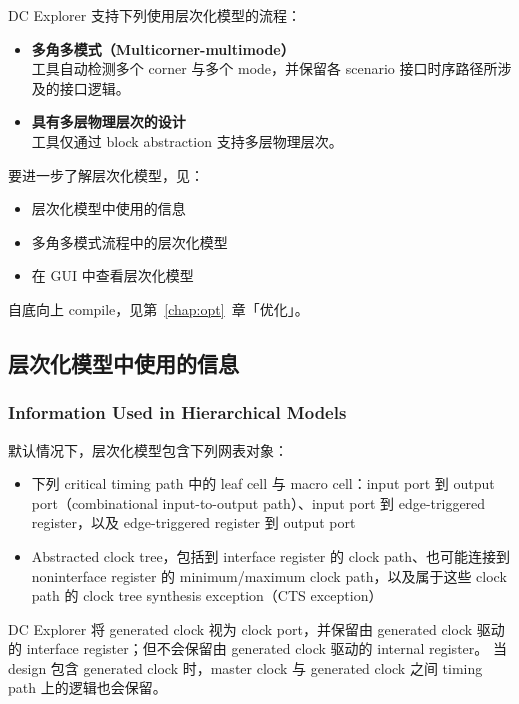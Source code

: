 
DC Explorer 支持下列使用层次化模型的流程：
\begin{itemize}
  \item \textbf{多角多模式（Multicorner-multimode）}\\
        工具自动检测多个 corner 与多个 mode，并保留各 scenario 接口时序路径所涉及的接口逻辑。
  \item \textbf{具有多层物理层次的设计}\\
        工具仅通过 block abstraction 支持多层物理层次。
\end{itemize}

要进一步了解层次化模型，见：
\begin{itemize}
  \item 层次化模型中使用的信息
  \item 多角多模式流程中的层次化模型
  \item 在 GUI 中查看层次化模型
\end{itemize}

\begin{seeAlsoBox}
自底向上 compile，见第~\ref{chap:opt}~章「优化」。
\end{seeAlsoBox}

\subsection{层次化模型中使用的信息}
\subsubsection*{Information Used in Hierarchical Models}

默认情况下，层次化模型包含下列网表对象：
\begin{itemize}
  \item 下列 critical timing path 中的 leaf cell 与 macro cell：input port 到 output port（combinational input-to-output path）、input port 到 edge-triggered register，以及 edge-triggered register 到 output port
  \item Abstracted clock tree，包括到 interface register 的 clock path、也可能连接到 noninterface register 的 minimum/maximum clock path，以及属于这些 clock path 的 clock tree synthesis exception（CTS exception）
\end{itemize}

DC Explorer 将 generated clock 视为 clock port，并保留由 generated clock 驱动的 interface register；但不会保留由 generated clock 驱动的 internal register。
当 design 包含 generated clock 时，master clock 与 generated clock 之间 timing path 上的逻辑也会保留。

